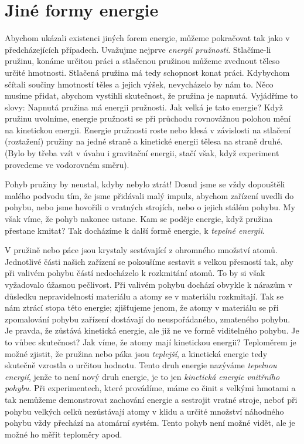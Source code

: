   \section{Jiné formy energie}
    Abychom ukázali existenci jiných forem energie, můžeme pokračovat tak jako v předcházejících 
    případech. Uvažujme nejprve \emph{energii pružnosti}. Stlačíme-li pružinu, konáme určitou práci 
    a stlačenou pružinou můžeme zvednout těleso určité hmotnosti. Stlačená pružina má tedy 
    schopnost konat práci. Kdybychom sčítali součiny hmotností těles a jejich výšek, nevycházelo by 
    nám to. Něco musíme přidat, abychom vystihli skutečnost, že pružina je napnutá. Vyjádříme to 
    slovy: Napnutá pružina má energii pružnosti. Jak velká je tato energie? Když pružinu uvolníme, 
    energie pružnosti se při průchodu rovnovážnou polohou mění na kinetickou energii. Energie 
    pružnosti roste nebo klesá v závislosti na stlačení (roztažení) pružiny na jedné straně a 
    kinetické energii tělesa na straně druhé. (Bylo by třeba vzít v úvahu i gravitační energii, 
    stačí však, když experiment provedeme ve vodorovném směru).
    
    Pohyb pružiny by neustal, kdyby nebylo ztrát! Dosud jsme se vždy dopouštěli malého podvodu tím, 
    že jsme přidávali malý impulz, abychom zařízení uvedli do pohybu, nebo jsme hovořili o vratných 
    strojích, nebo o jejich stálém pohybu. My však víme, že pohyb nakonec ustane. Kam se poděje 
    energie, když pružina přestane kmitat? Tak docházíme k další formě energie, k \emph{tepelné 
    energii}.
    
    V pružině nebo páce jsou krystaly sestávající z ohromného množství atomů. Jednotlivé části 
    našich zařízení se pokoušíme sestavit s velkou přesností tak, aby při valivém pohybu částí 
    nedocházelo k rozkmitání atomů. To by si však vyžadovalo úžasnou pečlivost. Při valivém pohybu 
    dochází obvykle k nárazům v důsledku nepravidelností materiálu a atomy se v materiálu 
    rozkmitají. Tak se nám ztrácí stopa této energie; zjišťujeme jenom, že atomy v materiálu se při 
    zpomalování pohybu zařízení dostávají do neuspořádaného, zmateného pohybu. Je pravda, že 
    zůstává kinetická energie, ale již ne ve formě viditelného pohybu. Je to vůbec skutečnost? Jak 
    víme, že atomy mají kinetickou energii? Teploměrem je možné zjistit, že pružina nebo páka jsou 
    \emph{teplejší}, a kinetická energie tedy skutečně vzrostla o určitou hodnotu. Tento druh 
    energie nazýváme \emph{tepelnou energií}, jenže to není nový druh energie, je to jen 
    \emph{kinetická energie vnitřního pohybu}. Při experimentech, které provádíme, máme co činit s 
    velkými hmotami a tak nemůžeme demonstrovat zachování energie a sestrojit vratné stroje, neboť 
    při pohybu velkých celků nezůstávají atomy v klidu a určité množství náhodného pohybu vždy 
    přechází na atomární systém. Tento pohyb není možné vidět, ale je možné ho měřit teploměry apod.
    
